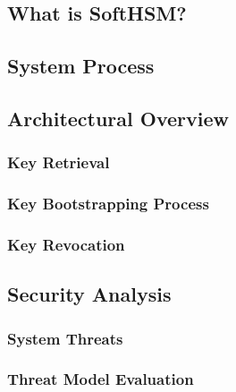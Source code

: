 		\subsection{What is SoftHSM?}

		\subsection{System Process}

			\subsection{Architectural Overview}

			\subsubsection{Key Retrieval}

			\subsubsection{Key Bootstrapping Process}

			\subsubsection{Key Revocation}

		\subsection{Security Analysis}

			\subsubsection{System Threats}

			\subsubsection{Threat Model Evaluation}


